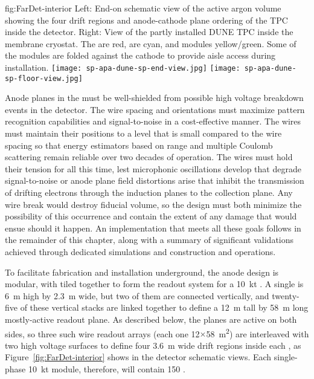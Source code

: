 \begin{dunefigure}{fig:FarDet-interior}
{Left: End-on schematic view of the active argon volume showing the four drift regions and anode-cathode plane ordering of the TPC inside the detector. Right: View of the partly installed DUNE TPC inside the membrane cryostat. The  are red,  are cyan, and  modules yellow/green.  Some of the  modules are folded against the cathode to provide aisle access during installation.}
\texttt{[image: sp-apa-dune-sp-end-view.jpg]}\hspace{0.01\textwidth}
\texttt{[image: sp-apa-dune-sp-floor-view.jpg]}
\end{dunefigure}

Anode planes in the  must be well-shielded from possible high voltage breakdown events in the detector.  The  wire spacing and orientations must maximize pattern recognition capabilities and signal-to-noise in a cost-effective manner.  The  wires must maintain their positions to a level that is small compared to the wire spacing so that energy estimators based on range and multiple Coulomb scattering remain reliable over two decades of operation.  The wires must hold their tension for all this time, lest microphonic oscillations develop that degrade signal-to-noise or anode plane field distortions arise that inhibit the transmission of drifting electrons through the induction planes to the collection plane.  Any wire break would destroy fiducial volume, so the  design must both minimize the possibility of this occurrence and contain the extent of any damage that would ensue should it happen.  An  implementation that meets all these goals follows in the remainder of this chapter, along with a summary of significant validations achieved through dedicated simulations and  construction and operations.

To facilitate fabrication and installation underground, the anode design is modular, with  tiled together to form the readout system for a \SI{10}{kt} . A single  is \SI{6}{m} high by \SI{2.3}{m} wide, but two of them are connected vertically, and twenty-five of these vertical stacks are linked together to define a \SI{12}{m} tall by \SI{58}{m} long mostly-active readout plane.  As described below, the planes are active on both sides, so three such wire readout arrays (each one \num{12}$\times$\SI{58}{m^2}) are interleaved with two high voltage surfaces to define four \SI{3.6}{m} wide drift regions inside each , as Figure~\ref{fig:FarDet-interior} shows in the detector schematic views. Each single-phase \SI{10}{kt} module, therefore, will contain 150 .

